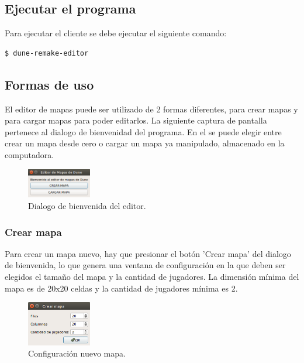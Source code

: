 \documentclass[titlepage,a4paper,12pt]{article}
\begin{document}
\subsection{Ejecutar el programa}

Para ejecutar el cliente se debe ejecutar el siguiente comando:
\begin{verbatim}
$ dune-remake-editor
\end{verbatim}

\subsection{Formas de uso}

El editor de mapas puede ser utilizado de 2 formas diferentes, para crear mapas y para cargar mapas para poder editarlos. La siguiente captura de pantalla pertenece al dialogo de bienvenidad del programa. En el se puede elegir entre crear un mapa desde cero o cargar un mapa ya manipulado, almacenado en la computadora.

\begin{figure}[H]
	\centering
	\includegraphics[width=0.25\textwidth]{../imagenes/bienvenida_editor.png}
	\caption{\label{fig:menu_editor} Dialogo de bienvenida del editor.}
\end{figure}

\subsubsection{Crear mapa}

Para crear un mapa nuevo, hay que presionar el botón 'Crear mapa' del dialogo de bienvenida, lo que genera una ventana de configuración en la que deben ser elegidos el tamaño del mapa y la cantidad de jugadores. La dimensión mínima del mapa es de 20x20 celdas y la cantidad de jugadores mínima es 2. \\

\begin{figure}[H]
	\centering
	\includegraphics[width=0.25\textwidth]{../imagenes/conf_nuevo_mapa.png}
	\caption{\label{fig:menu_editor} Configuración nuevo mapa.}
\end{figure}
\end{document}
